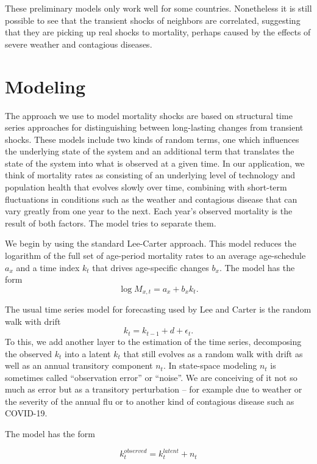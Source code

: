 \documentclass[12pt]{article}
\begin{document}
These preliminary models only work well for some
countries. Nonetheless it is still possible to see that the transient
shocks of neighbors are correlated, suggesting that they are picking
up real shocks to mortality, perhaps caused by the effects of severe
weather and contagious diseases.


\section{Modeling}

The approach we use to model mortality shocks are based on structural
time series approaches for distinguishing between long-lasting changes
from transient shocks. These models include two kinds of random terms,
one which influences the underlying state of the system and an
additional term that translates the state of the system into what is
observed at a given time. In our application, we think of mortality
rates as consisting of an underlying level of technology and
population health that evolves slowly over time, combining with
short-term fluctuations in conditions such as the weather and
contagious disease that can vary greatly from one year to the next.
Each year's observed mortality is the result of both factors. The model tries
to separate them.

We begin by using the standard Lee-Carter approach. This model reduces
the logarithm of the full set of age-period mortality rates to an
average age-schedule $a_x$ and a time index $k_t$ that drives
age-specific changes $b_x$. The model has the form
$$
\log M_{x,t} = a_x + b_x k_t.
$$

The usual time series model for forecasting used by Lee and Carter is
the random walk with drift
$$
k_t = k_{t-1} + d + \epsilon_t.
$$
To this, we add another layer to the estimation of the time series,
decomposing the observed $k_t$ into a latent $k_t$ that still evolves as a
random walk with drift as well as an annual transitory component $n_t$. In
state-space modeling $n_t$ is sometimes called ``observation
error'' or ``noise''. We are conceiving of it not so much as error but as a
transitory perturbation -- for example due to weather or the severity
of the annual flu or to another kind of contagious disease such as
COVID-19.

The model has the form

\begin{equation}
  k_t^{observed} = k_t^{latent} + n_t
\end{equation}
\end{document}
